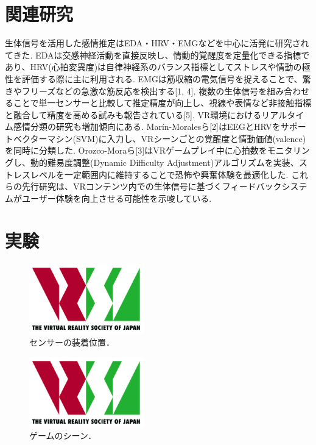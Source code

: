 \documentclass[a4paper]{jarticle}
\begin{document}
\section{関連研究}%

生体信号を活用した感情推定はEDA・HRV・EMGなどを中心に活発に研究されてきた. EDAは交感神経活動を直接反映し、情動的覚醒度を定量化できる指標であり、HRV(心拍変異度)は自律神経系のバランス指標としてストレスや情動の極性を評価する際に主に利用される. EMGは筋収縮の電気信号を捉えることで、驚きやフリーズなどの急激な筋反応を検出する[1, 4]. 複数の生体信号を組み合わせることで単一センサーと比較して推定精度が向上し、視線や表情など非接触指標と融合して精度を高める試みも報告されている[5]. VR環境におけるリアルタイム感情分類の研究も増加傾向にある. Marín-Moralesら[2]はEEGとHRVをサポートベクターマシン(SVM)に入力し、VRシーンごとの覚醒度と情動価値(valence)を同時に分類した. Orozco-Moraら[3]はVRゲームプレイ中に心拍数をモニタリングし、動的難易度調整(Dynamic Difficulty Adjustment)アルゴリズムを実装、ストレスレベルを一定範囲内に維持することで恐怖や興奮体験を最適化した. これらの先行研究は、VRコンテンツ内での生体信号に基づくフィードバックシステムがユーザー体験を向上させる可能性を示唆している.

\section{実験}%

\begin{figure}[tb]
  \begin{center}
    \includegraphics*[width=50mm]{logo.png}
  \end{center}
  \vspace*{-6mm}
  \caption{センサーの装着位置．}
  \label{figure}
\end{figure}

\begin{figure}[tb]
  \begin{center}
    \includegraphics*[width=50mm]{logo.png}
  \end{center}
  \vspace*{-6mm}
  \caption{ゲームのシーン．}
  \label{figure}
\end{figure}
\end{document}
